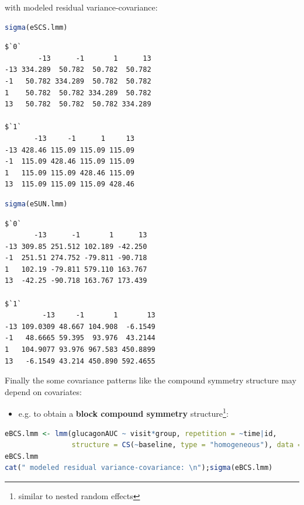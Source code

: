 \documentclass[12pt]{article}
\begin{document}
with modeled residual variance-covariance:

\bigskip

\begin{minipage}{0.47\linewidth}
\begin{lstlisting}[language=r,numbers=none]
sigma(eSCS.lmm)
\end{lstlisting}

\label{}
\begin{verbatim}
$`0`
        -13      -1       1      13
-13 334.289  50.782  50.782  50.782
-1   50.782 334.289  50.782  50.782
1    50.782  50.782 334.289  50.782
13   50.782  50.782  50.782 334.289

$`1`
       -13     -1      1     13
-13 428.46 115.09 115.09 115.09
-1  115.09 428.46 115.09 115.09
1   115.09 115.09 428.46 115.09
13  115.09 115.09 115.09 428.46
\end{verbatim}
\end{minipage}
\begin{minipage}{0.47\linewidth}
\begin{lstlisting}[language=r,numbers=none]
sigma(eSUN.lmm)
\end{lstlisting}

\label{}
\begin{verbatim}
$`0`
       -13      -1       1      13
-13 309.85 251.512 102.189 -42.250
-1  251.51 274.752 -79.811 -90.718
1   102.19 -79.811 579.110 163.767
13  -42.25 -90.718 163.767 173.439

$`1`
         -13     -1       1       13
-13 109.0309 48.667 104.908  -6.1549
-1   48.6665 59.395  93.976  43.2144
1   104.9077 93.976 967.583 450.8899
13   -6.1549 43.214 450.890 592.4655
\end{verbatim}
\end{minipage}

\clearpage

\noindent Finally the some covariance patterns like the compound
symmetry structure may depend on covariates:
\begin{itemize}
\item e.g. to obtain a \textbf{block compound symmetry} structure\footnote{similar to
nested random effects}:
\end{itemize}
\begin{lstlisting}[language=r,numbers=none]
eBCS.lmm <- lmm(glucagonAUC ~ visit*group, repetition = ~time|id,
                structure = CS(~baseline, type = "homogeneous"), data = gastricbypassL)
eBCS.lmm
cat(" modeled residual variance-covariance: \n");sigma(eBCS.lmm)
\end{lstlisting}
\end{document}
